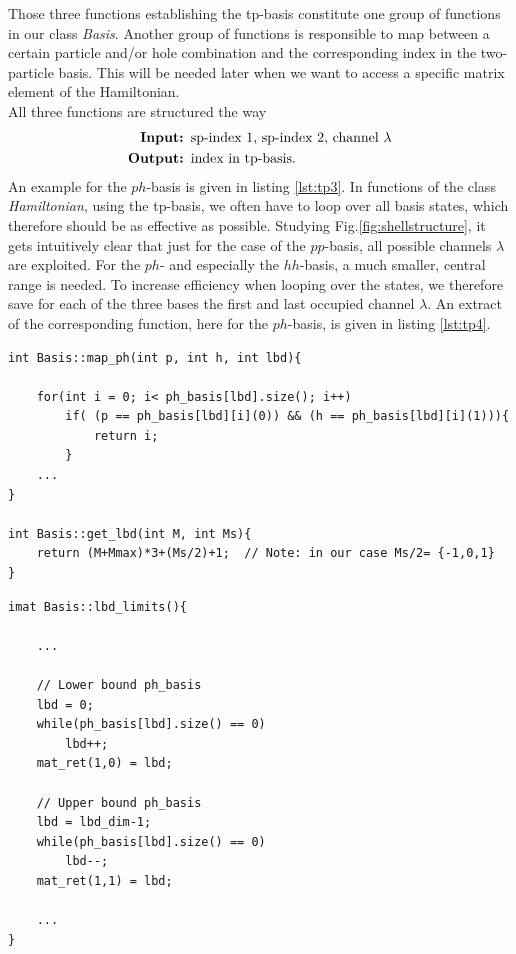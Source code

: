 Those three functions establishing the tp-basis constitute one group of functions in our class \textit{Basis}. Another group of functions is responsible to map between a certain particle and/or hole combination and the corresponding index in the two-particle basis. This will be needed later when we want to access a specific matrix element of the Hamiltonian.\\
All three functions are structured the way
\begin{align*}
\text{\textbf{Input: }}& \text{sp-index 1, sp-index 2, channel $\lambda$} \\
\text{\textbf{Output: }}& \text{index in tp-basis}.
\end{align*}
An example for the $ph$-basis is given in listing \ref{lst:tp3}. In functions of the class \textit{Hamiltonian}, using the tp-basis, we often have to loop over all basis states, which therefore should be as effective as possible. Studying Fig.\ref{fig:shellstructure}, it gets intuitively clear that just for the case of the $pp$-basis, all possible channels $\lambda$ are exploited. For the $ph$- and especially the $hh$-basis, a much smaller, central range is needed. To increase efficiency when looping over the states, we therefore save for each of the three bases the first and last occupied channel $\lambda$. An extract of the corresponding function, here for the $ph$-basis, is given in listing \ref{lst:tp4}.

\begin{lstlisting}[float, caption={Mapping between a pair of one particle and one hole and the corresponding index in the two-particle basis. For the case that the channel $\lambda$ is not known in advance, it can be obtained by the function \textit{get\_lbd}, which has to be provided with the quantum numbers $M$ and $M_s$ and returns the channel $\lambda$.}, label={lst:tp3}, numbers=none]
int Basis::map_ph(int p, int h, int lbd){ 
    
    for(int i = 0; i< ph_basis[lbd].size(); i++)
        if( (p == ph_basis[lbd][i](0)) && (h == ph_basis[lbd][i](1))){
            return i;
        }
    ...    
}

int Basis::get_lbd(int M, int Ms){ 
    return (M+Mmax)*3+(Ms/2)+1;  // Note: in our case Ms/2= {-1,0,1}   
}

\end{lstlisting}
 
\begin{lstlisting}[float, caption={Getting the first and last occupied channel $\lambda$, here an extract for the $ph$-basis. The boundaries are saved in an integer-matrix, which is returned by the function.}, label={lst:tp4}, numbers=none]
imat Basis::lbd_limits(){

    ...
    
    // Lower bound ph_basis
    lbd = 0;
    while(ph_basis[lbd].size() == 0)
        lbd++;   
    mat_ret(1,0) = lbd;
    
    // Upper bound ph_basis
    lbd = lbd_dim-1;
    while(ph_basis[lbd].size() == 0)
        lbd--; 
    mat_ret(1,1) = lbd;
    
    ...
}
\end{lstlisting}


